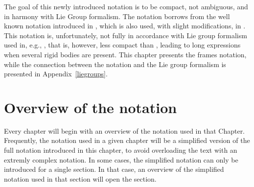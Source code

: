 The goal of this newly introduced notation is to be compact, not ambiguous, and in harmony with Lie Group formalism. 
The notation borrows from the well known notation introduced in \citep{featherstone2008}, which is also used, with slight  modifications, in \citep{Featherstone2016}. This notation
is, unfortunately, not fully in accordance with Lie group
formalism used in, e.g., \citep{murray1994,park1995lie,kimlie},
that is, however, less compact than \citep{featherstone2008}, leading to long expressions when several rigid bodies are present. This chapter presents the frames notation, while the connection between the notation and the Lie group formalism is presented in Appendix~\ref{liegroups}.



\section{Overview of the notation}

\begin{remark}
Every chapter will begin with an overview of the notation used in that Chapter. Frequently, the notation used in a given chapter will be a simplified version of the full notation introduced in this chapter, to avoid overloading the text with an extremly complex notation. In some cases, the simplified notation can only be introduced for a single section. In that case, an overview of the simplified notation used in that section will open the section.
\end{remark}

